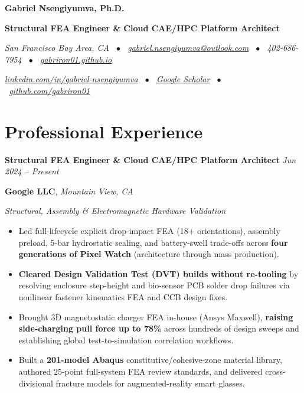 \documentclass[10pt,letterpaper]{article}
\newcommand{\name}[1]{{\LARGE \textbf{#1}}\par\vspace{2.5pt}}
\newcommand{\subtitle}[1]{{\normalsize \textbf{#1}}\par\vspace{2pt}}
\newcommand{\contact}[1]{{\small \textit{#1}}\par\vspace{1pt}}
\newcommand{\summary}[1]{\vspace{2pt}{\normalsize #1}\par}
\newcommand{\roleheader}[4]{%
  \vspace{3pt}
  \noindent\textbf{#2} \hfill \textit{#4}\par
  \noindent\textbf{#1}, \textit{#3}\par
  \vspace{1pt}
}
\newcommand{\subhead}[1]{%
  \vspace{1.5pt}\noindent\textit{#1}\par\vspace{0.5pt}
}
\begin{document}
\name{Gabriel Nsengiyumva, Ph.D.}
\subtitle{Structural FEA Engineer \& Cloud CAE/HPC Platform Architect}
\contact{San Francisco Bay Area, CA \ $\bullet$ \ \href{mailto:gabriel.nsengiyumva@outlook.com}{gabriel.nsengiyumva@outlook.com} \ $\bullet$ \ 402-686-7954 \ $\bullet$ \ \href{https://gabriron01.github.io/}{gabriron01.github.io}}
\contact{\href{https://www.linkedin.com/in/gabriel-nsengiyumva/}{linkedin.com/in/gabriel-nsengiyumva} \ $\bullet$ \ \href{https://scholar.google.com/citations?user=mLKBGUMAAAAJ&hl=en}{Google Scholar} \ $\bullet$ \ \href{https://github.com/gabriron01}{github.com/gabriron01}}
\summary{Finite Element Analysis (FEA) and computational solid mechanics engineer (10+ years) leading impact, fracture, and electromagnetic validation across consumer wearables and electric vehicles while architecting 2,000+ core cloud HPC platforms.}

\section*{Professional Experience}

\roleheader{Google LLC}{Structural FEA Engineer \& Cloud CAE/HPC Platform Architect}{Mountain View, CA}{Jun 2024 -- Present}

\subhead{Structural, Assembly \& Electromagnetic Hardware Validation}
\begin{itemize}
  \item Led full-lifecycle explicit drop-impact FEA (18+ orientations), assembly preload, 5-bar hydrostatic sealing, and battery-swell trade-offs across \textbf{four generations of Pixel Watch} (architecture through mass production).
  \item \textbf{Cleared Design Validation Test (DVT) builds without re-tooling} by resolving enclosure step-height and bio-sensor PCB solder drop failures via nonlinear fastener kinematics FEA and CCB design fixes.
  \item Brought 3D magnetostatic charger FEA in-house (Ansys Maxwell), \textbf{raising side-charging pull force up to 78\%} across hundreds of design sweeps and establishing global test-to-simulation correlation workflows.
  \item Built a \textbf{201-model Abaqus} constitutive/cohesive-zone material library, authored 25-point full-system FEA review standards, and delivered cross-divisional fracture models for augmented-reality smart glasses.
\end{itemize}
\end{document}
